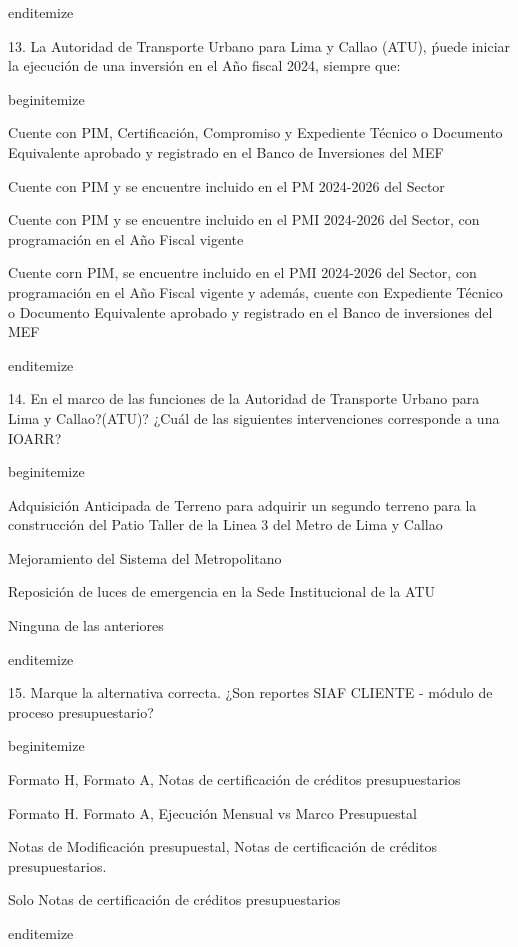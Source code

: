 end{itemize}

13. La Autoridad de Transporte Urbano para Lima y Callao (ATU), ṕuede iniciar la ejecución de una inversión en el Año fiscal 2024, siempre que:


begin{itemize}
			\item Cuente con PIM, Certificación, Compromiso y Expediente Técnico o Documento Equivalente aprobado y registrado en el Banco de Inversiones del MEF 
			\item Cuente con PIM y se encuentre incluido en el PM 2024-2026 del Sector
			\item Cuente con PIM y se encuentre incluido en el PMI 2024-2026 del Sector, con programación en el Año Fiscal vigente
			\item Cuente corn PIM, se encuentre incluido en el PMI 2024-2026 del Sector, con programación en el Año Fiscal vigente y además, cuente con Expediente Técnico o Documento Equivalente aprobado y registrado en el Banco de inversiones del MEF

end{itemize}

14. En el marco de las funciones de la Autoridad de Transporte Urbano para Lima y Callao?(ATU)? ¿Cuál de las siguientes intervenciones corresponde a una IOARR?

begin{itemize}
			\item Adquisición Anticipada de Terreno para adquirir un segundo terreno para la construcción del Patio Taller de la Linea 3 del Metro de Lima y Callao
			\item Mejoramiento del Sistema del Metropolitano
			\item Reposición de luces de emergencia en la Sede Institucional de la ATU
			\item Ninguna de las anteriores

end{itemize}

15. Marque la alternativa correcta. ¿Son reportes SIAF CLIENTE - módulo de proceso presupuestario?


begin{itemize}
			\item Formato H, Formato A, Notas de certificación de créditos presupuestarios
			\item Formato H. Formato A, Ejecución Mensual vs Marco Presupuestal
			\item Notas de Modificación presupuestal, Notas de certificación de créditos presupuestarios.
			\item Solo Notas de certificación de créditos presupuestarios

end{itemize}

